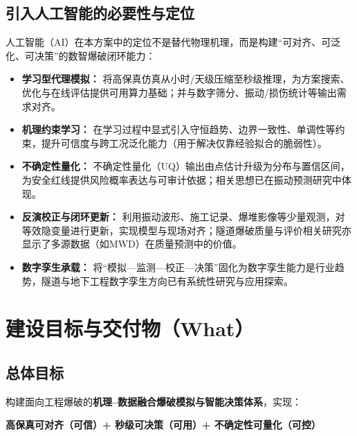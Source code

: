 \documentclass[12pt,a4paper,fontset=mac]{ctexart}
\newcommand{\abbr}[2]{#1（\textsc{#2}）} %
\newcommand{\MWD}{\textsc{MWD}}
\begin{document}
\subsection{引入人工智能的必要性与定位}
\abbr{人工智能}{AI}在本方案中的定位不是替代物理机理，而是构建“可对齐、可泛化、可决策”的数智爆破闭环能力：
\begin{itemize}
  \item \textbf{学习型代理模拟：} 将高保真仿真从小时/天级压缩至秒级推理，为方案搜索、优化与在线评估提供可用算力基础；并与数字筛分、振动/损伤统计等输出需求对齐\cite{Song2025DigitalSievingFragmentation}。
  \item \textbf{机理约束学习：} 在学习过程中显式引入守恒趋势、边界一致性、单调性等约束，提升可信度与跨工况泛化能力（用于解决仅靠经验拟合的脆弱性）。
  \item \textbf{不确定性量化：} \abbr{不确定性量化}{UQ}输出由点估计升级为分布与置信区间，为安全红线提供风险概率表达与可审计依据；相关思想已在振动预测研究中体现\cite{BozkurtKeser2025DeepEnsemblePPV}。
  \item \textbf{反演校正与闭环更新：} 利用振动波形、施工记录、爆堆影像等少量观测，对等效隐变量进行更新，实现模型与现场对齐；隧道爆破质量与评价相关研究亦显示了多源数据（如\MWD）在质量预测中的价值\cite{Jin2025MWDQuality,Shi2024TunnelBlastingReview}。
  \item \textbf{数字孪生承载：} 将“模拟—监测—校正—决策”固化为数字孪生能力是行业趋势，隧道与地下工程数字孪生方向已有系统性研究与应用探索\cite{Li2024TunnelDT,Salzgeber2024FromDigitalModelToDT,Fang2024StatusDTOverUnderExcavation,Zhu2025DTUndergroundInfraReview,Michal2025DTInTunnelConstruction,Sharafat2025DTCavernStability,Pan2025DTOverbreak,Lapcevic2025DTBlastFragmentation,Li2025JointDistributionTunnel}。
\end{itemize}

\section{建设目标与交付物（What）}

\subsection{总体目标}
构建面向工程爆破的\textbf{机理--数据融合爆破模拟与智能决策体系}，实现：
\begin{center}
\textbf{高保真可对齐（可信）\quad + \quad 秒级可决策（可用）\quad + \quad 不确定性可量化（可控）}
\end{center}
\end{document}
